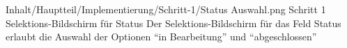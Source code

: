 \begin{alexfigure}{Inhalt/Hauptteil/Implementierung/Schritt-1/Status Auswahl.png}
  {Schritt 1 Selektions-Bildschirm für Status}
  {Der Selektions-Bildschirm für das Feld Status erlaubt die Auswahl der Optionen \enquote{in Bearbeitung} und \enquote{abgeschlossen}}

  \label{fig:Schritt1SelektionsBildschirmStatus}

\end{alexfigure}


